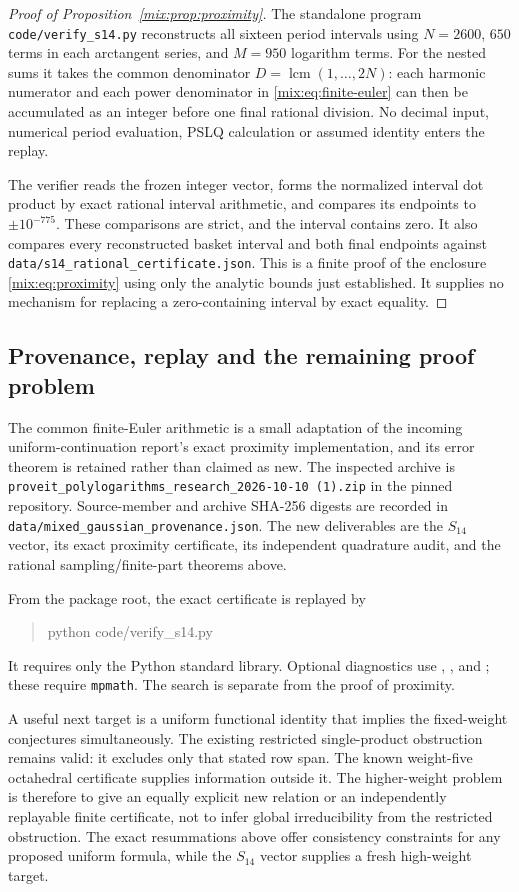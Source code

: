 \begin{proof}[Proof of Proposition~\ref{mix:prop:proximity}]
The standalone program \texttt{code/verify\_s14.py} reconstructs all
sixteen period intervals using $N=2600$, $650$ terms in each arctangent
series, and $M=950$ logarithm terms.  For the nested sums it takes the
common denominator $D=\operatorname{lcm}(1,\ldots,2N)$: each harmonic
numerator and each power denominator in \eqref{mix:eq:finite-euler}
can then be accumulated as an integer before one final rational division.
No decimal input, numerical period evaluation, PSLQ calculation or
assumed identity enters the replay.

The verifier reads the frozen integer vector, forms the normalized
interval dot product by exact rational interval arithmetic, and compares
its endpoints to $\pm10^{-775}$. These comparisons are strict, and the
interval contains zero. It also compares every reconstructed basket
interval and both final endpoints against
\texttt{data/s14\_rational\_certificate.json}. This is a finite proof
of the enclosure \eqref{mix:eq:proximity} using only the analytic bounds
just established. It supplies no mechanism for replacing a zero-containing
interval by exact equality.
\end{proof}

\subsection{Provenance, replay and the remaining proof problem}

The common finite-Euler arithmetic is a small adaptation of the incoming
uniform-continuation report's exact proximity implementation, and its
error theorem is retained rather than claimed as new.  The inspected
archive is \texttt{proveit\_polylogarithms\_research\_2026-10-10 (1).zip}
in the pinned repository. Source-member and archive SHA-256 digests are
recorded in \texttt{data/mixed\_gaussian\_provenance.json}.
The new deliverables are the $S_{14}$ vector, its exact proximity
certificate, its independent quadrature audit, and the rational
sampling/finite-part theorems above.

From the package root, the exact certificate is replayed by
\begin{quote}\ttfamily
python code/verify\_s14.py
\end{quote}
It requires only the Python standard library.
Optional diagnostics use ,
, and ;
these require \texttt{mpmath}. The search is separate from the
proof of proximity.

A useful next target is a uniform functional identity that implies the
fixed-weight conjectures simultaneously. The existing restricted
single-product obstruction remains valid: it excludes only that stated
row span. The known weight-five octahedral certificate supplies
information outside it. The higher-weight problem is therefore to give
an equally explicit new relation or an independently replayable finite
certificate, not to infer global irreducibility from the restricted
obstruction. The exact resummations above offer consistency constraints
for any proposed uniform formula, while the $S_{14}$ vector supplies a
fresh high-weight target.
